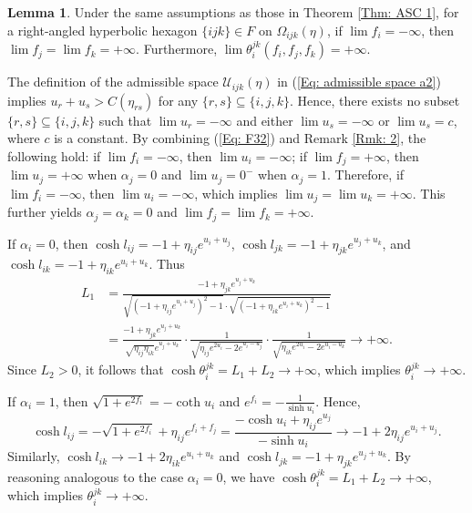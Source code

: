 \documentclass[12pt]{amsart}
\theoremstyle{definition}
\newtheorem{lemma}[theorem]{Lemma}
\begin{document}
\begin{lemma}\label{Lem: limit a2}
Under the same assumptions as those in Theorem \ref{Thm: ASC 1},
for a right-angled hyperbolic  hexagon $\{ijk\}\in F$ on $\Omega_{ijk}(\eta)$, if $\lim f_i=-\infty$,
then $\lim f_j=\lim f_k=+\infty$.
Furthermore, $\lim\theta^{jk}_i(f_i,f_j,f_k)=+\infty$.
\end{lemma}
\proof
The definition of the admissible space $\mathcal{U}_{ijk}(\eta)$ in (\ref{Eq: admissible space a2}) implies $u_r+u_s>C(\eta_{rs})$ for any $\{r,s\}\subseteq\{i,j,k\}$.
Hence, there exists no subset $\{r,s\}\subseteq\{i,j,k\}$ such that $\lim u_r=-\infty$ and either $\lim u_s=-\infty$ or $\lim u_s=c$, where $c$ is a constant.
By combining (\ref{Eq: F32}) and Remark \ref{Rmk: 2}, the following hold: 
if $\lim f_i=-\infty$, then $\lim u_i=-\infty$;
if $\lim f_j=+\infty$, then $\lim u_j=+\infty$ when $\alpha_j=0$ and $\lim u_j=0^-$ when $\alpha_j=1$.
Therefore, if $\lim f_i=-\infty$, then $\lim u_i=-\infty$, which implies $\lim u_j=\lim u_k=+\infty$. 
This further yields $\alpha_j=\alpha_k=0$ and $\lim f_j=\lim f_k=+\infty$.

If $\alpha_i=0$, then
$\cosh l_{ij}=-1+\eta_{ij}e^{u_i+u_j}$, 
$\cosh l_{jk}=-1+\eta_{jk}e^{u_j+u_k}$, and
$\cosh l_{ik}=-1+\eta_{ik}e^{u_i+u_k}$.
Thus
\begin{equation*}
\begin{aligned}
L_1&=\frac{-1+\eta_{jk}e^{u_j+u_k}}
{\sqrt{(-1+\eta_{ij}e^{u_i+u_j})^2-1}\cdot
\sqrt{(-1+\eta_{ik}e^{u_i+u_k})^2-1}}\\
&=\frac{-1+\eta_{jk}e^{u_j+u_k}}
{\sqrt{\eta_{ij}\eta_{ik}}e^{u_j+u_k}}\cdot
\frac{1}{\sqrt{\eta_{ij}e^{2u_i}-2e^{u_i-u_j}}}\cdot
\frac{1}{\sqrt{\eta_{ik}e^{2u_i}-2e^{u_i-u_k}}}
\rightarrow +\infty.
\end{aligned}
\end{equation*}
Since $L_2>0$, it follows that $\cosh \theta^{jk}_i=L_1+L_2\rightarrow +\infty$,
which implies $\theta^{jk}_i\rightarrow +\infty$.

If $\alpha_i=1$, then $\sqrt{1+e^{2f_i}}=-\coth u_i$
and $e^{f_i}=-\frac{1}{\sinh u_i}$.
Hence,
\begin{equation*}
\cosh l_{ij}=-\sqrt{1+e^{2f_i}}+\eta_{ij}e^{f_i+f_j}
=\frac{-\cosh u_i+\eta_{ij}e^{u_j}}{-\sinh u_i}\rightarrow-1+2\eta_{ij}e^{u_i+u_j}.
\end{equation*}
Similarly, $\cosh l_{ik}\rightarrow-1+2\eta_{ik}e^{u_i+u_k}$ and
$\cosh l_{jk}=-1+\eta_{jk}e^{u_j+u_k}$.
By reasoning analogous to the case $\alpha_i=0$,
we have $\cosh \theta^{jk}_i=L_1+L_2\rightarrow +\infty$, which implies $\theta^{jk}_i\rightarrow +\infty$.
\end{document}
